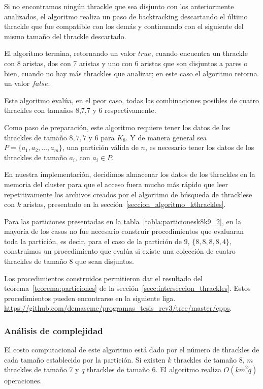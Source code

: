   Si no encontramos ningún thrackle que sea disjunto con los anteriormente analizados, el
  algoritmo realiza un paso de backtracking descartando el último thrackle que fue
  compatible con los demás y continuando con el siguiente del mismo tamaño del thrackle
  descartado.

  El algoritmo termina, retornando un valor $true$, cuando encuentra un thrackle con 8
  aristas, dos con 7 aristas y uno con 6 aristas que son disjuntos a pares o bien, cuando
  no hay más thrackles que analizar; en este caso el algoritmo retorna un valor $false$.

  Este algoritmo evalúa, en el peor caso, todas las combinaciones posibles de cuatro
  thrackles con tamaños 8,7,7 y 6 respectivamente.

  Como paso de preparación, este algoritmo requiere tener los datos de los thrackles de
  tamaño $8,7,7$ y $6$ para $K_8$. Y de manera general sea $P=\{a_1,a_2,\dots,a_m\}$, una
  partición válida de $n$, es necesario tener los datos de los thrackles de tamaño $a_i$,
  con $a_i\in P$.

  En nuestra implementación, decidimos almacenar los datos de los thrackles en la memoria
  del cluster para que el acceso fuera mucho más rápido que leer repetitivamente los
  archivos creados por el algoritmo de búsqueda de thracklese con $k$ aristas, presentado
  en la sección~\ref{seccion_algoritmo_kthrackles}.

  Para las particiones presentadas en la tabla~\ref{tabla:particionesk8k9_2}, en la
  mayoría de los casos no fue necesario construir procedimientos que evaluaran toda la
  partición, es decir, para el caso de la partición de $9$, $\{8,8,8,8,4\}$, construimos
  un procedimiento que evalúa si existe una colección de cuatro thrackles de tamaño 8 que
  sean disjuntos.

  Los procedimientos construidos permitieron dar el resultado del
  teorema~\ref{teorema:particiones} de la sección~\ref{secc:interseccion_thrackles}.
  Estos procedimientos pueden encontrarse en la siguiente liga.
  \url{https://github.com/demaseme/programas_tesis_rev3/tree/master/cpps}.
  \subsubsection{Análisis de complejidad}
  El costo computacional de este algoritmo está dado por el número de thrackles de cada
  tamaño establecido por la partición. Si existen $k$ thrackles de tamaño 8, $m$
  thrackles de tamaño 7 y $q$ thrackles de tamaño 6. El algoritmo realiza $O(k\dot
  m^2\dot q)$ operaciones.


